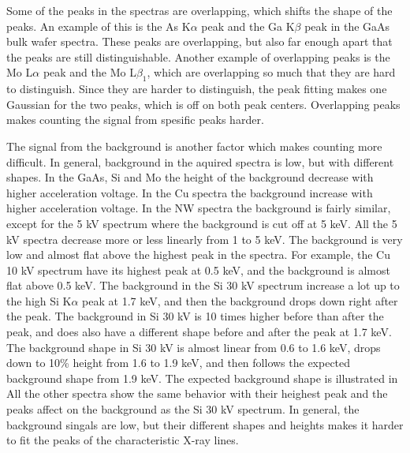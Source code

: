 Some of the peaks in the spectras are overlapping, which shifts the shape of the peaks.
An example of this is the As K$\alpha$ peak and the Ga K$\beta$ peak in the GaAs bulk wafer spectra.
These peaks are overlapping, but also far enough apart that the peaks are still distinguishable.
Another example of overlapping peaks is the Mo L$\alpha$ peak and the Mo L$\beta_1$, which are overlapping so much that they are hard to distinguish.
Since they are harder to distinguish, the peak fitting makes one Gaussian for the two peaks, which is off on both peak centers. %
Overlapping peaks makes counting the signal from spesific peaks harder.


The signal from the background is another factor which makes counting more difficult.
In general, background in the aquired spectra is low, but with different shapes.
In the GaAs, Si and Mo the height of the background decrease with higher acceleration voltage.
In the Cu spectra the background increase with higher acceleration voltage.
In the NW spectra the background is fairly similar, except for the 5 kV spectrum where the background is cut off at 5 keV.
All the 5 kV spectra decrease more or less linearly from 1 to 5 keV. %
The background is very low and almost flat above the highest peak in the spectra. %
For example, the Cu 10 kV spectrum have its highest peak at 0.5 keV, and the background is almost flat above 0.5 keV.
The background in the Si 30 kV spectrum increase a lot up to the high Si K$\alpha$ peak at 1.7 keV, and then the background drops down right after the peak.
The background in Si 30 kV is 10 times higher before than after the peak, and does also have a different shape before and after the peak at 1.7 keV.
The background shape in Si 30 kV is almost linear from 0.6 to 1.6 keV, drops down to 10\% height from 1.6 to 1.9 keV, and then follows the expected background shape from 1.9 keV.
The expected background shape is illustrated in  %
All the other spectra show the same behavior with their heighest peak and the peaks affect on the background as the Si 30 kV spectrum.
In general, the background singals are low, but their different shapes and heights makes it harder to fit the peaks of the characteristic X-ray lines.

